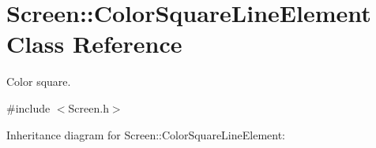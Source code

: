 \hypertarget{classScreen_1_1ColorSquareLineElement}{}\section{Screen\+:\+:Color\+Square\+Line\+Element Class Reference}
\label{classScreen_1_1ColorSquareLineElement}


Color square.  




{\ttfamily \#include $<$Screen.\+h$>$}



Inheritance diagram for Screen\+:\+:Color\+Square\+Line\+Element\+:
